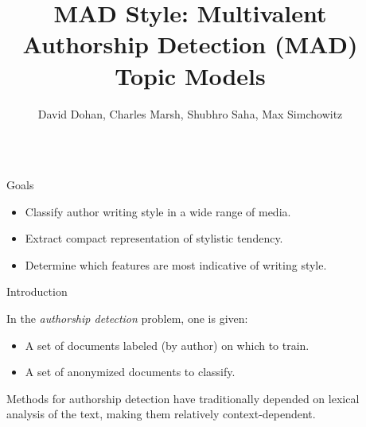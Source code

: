 \documentclass[final]{beamer}
\title{MAD Style: Multivalent Authorship Detection (MAD) Topic Models} %
\author{David Dohan, Charles Marsh, Shubhro Saha, Max Simchowitz} %
\institute{Princeton University, Department of Computer Science} %
\newlength{\sepwid}
\newlength{\onecolwid}
\begin{document}

\setlength{\belowcaptionskip}{2ex} %
\setlength\belowdisplayshortskip{2ex} %

\begin{frame}[t]  %

\begin{columns}[t] %

\begin{column}{\sepwid}\end{column} %

\begin{column}{\onecolwid} %


\begin{alertblock}{Goals}
\begin{itemize}
\item Classify author writing style in a wide range of media.
\item Extract compact representation of stylistic tendency.
\item Determine which features are most indicative of writing style.
\end{itemize}
\end{alertblock}


\begin{block}{Introduction}

In the \textit{authorship detection} problem, one is given:
\begin{itemize}
\item A set of documents labeled (by author) on which to train.
\item A set of anonymized documents to classify.
\end{itemize}Methods for authorship detection have traditionally depended on lexical analysis of the text, making them relatively context-dependent.


\end{block}
\end{column}
\end{columns}
\end{frame}
\end{document}
